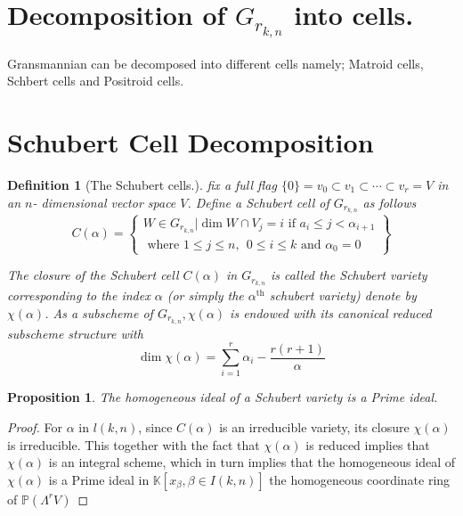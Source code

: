 \documentclass[12pt]{report}
\theoremstyle{theorem}
\newtheorem{definition}[theorem]{Definition}
\newtheorem{proposition}[theorem]{Proposition}
\begin{document}
\section*{Decomposition of $G_{r_{k,n}}$ into cells.}
Gransmannian can be decomposed into different cells namely; Matroid cells, Schbert cells and Positroid cells.

\section*{Schubert Cell Decomposition}
\begin{definition}[The Schubert cells.]
\normalfont fix a full flag $\{0\} = v_0\subset v_1\subset\cdots\subset v_r = V$ in an $n$- dimensional vector space $V$. Define a Schubert cell of $G_{r_{k,n}}$ as follows
\begin{equation*}
C(\alpha) = \left\{
\begin{split}
W\in G_{r_{k,n}}| \dim W\cap V_j = i \mbox{  if  } a_i\leq j < \alpha_{i+1}\\
\mbox{  where  } 1 \leq j \leq n, ~~ 0\leq i\leq k \mbox{  and  } \alpha_0 = 0
\end{split}
\right\}
\end{equation*}

The closure of the Schubert cell $C(\alpha)$ in $G_{r_{k,n}}$ is called the Schubert  variety corresponding to the index $\alpha$ (or simply the $\alpha^{\mbox{th}}$ schubert variety) denote by $\chi(\alpha)$. As a subscheme of $G_{r_{k,n}}, \chi(\alpha)$ is endowed with its canonical reduced subscheme structure with
$$
\dim\chi(\alpha) = \sum_{i = 1}^r \alpha_i-\frac{r(r+1)}{\alpha}
$$ 
\end{definition}

\begin{proposition}
The homogeneous ideal of a Schubert variety is a Prime ideal.
\end{proposition}
\begin{proof}
For $\alpha$ in $l(k,n)$, since $C(\alpha)$ is an irreducible variety, its closure $\chi(\alpha)$ is irreducible. This together with the fact that $\chi(\alpha)$ is reduced implies that $\chi(\alpha)$ is an integral scheme, which in turn implies that the homogeneous ideal of $\chi(\alpha)$ is a Prime ideal in $\mathbb{K}[x_{\beta}, \beta\in I(k,n)]$ the homogeneous coordinate ring of $\mathbb{P}(\Lambda^rV)$
\end{proof}
\end{document}
